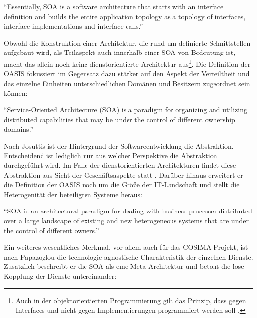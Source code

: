 \begin{definition}\label{def:soa_natis_2003_}
  "`Essentially, SOA is a software architecture that starts with an interface definition and builds the entire application topology as a topology of interfaces, interface implementations and interface calls."' \emph{\citep[S. 2]{natis2003soa}}
\end{definition}

  Obwohl die Konstruktion einer Architektur, die rund um definierte Schnittstellen aufgebaut wird, als Teilaspekt auch innerhalb einer SOA von Bedeutung ist, macht das allein noch keine dienstorientierte Architektur aus\footnote{Auch in der objektorientierten Programmierung gilt das Prinzip, dass gegen Interfaces und nicht gegen Implementierungen programmiert werden soll \citep[S. 18]{design_patterns}.}. Die Definition der OASIS fokussiert im Gegensatz dazu stärker auf den Aspekt der Verteiltheit und das einzelne Einheiten unterschiedlichen Domänen und Besitzern zugeordnet sein können:

\begin{definition}\label{def:soa_oasis_reference_model_}
  "`Service-Oriented Architecture (SOA) is a paradigm for organizing and utilizing distributed capabilities that may be under the control of different ownership domains."' \emph{\citep[S. 8]{mackenzie2006rms}}
\end{definition}

  Nach Josuttis ist der Hintergrund der Softwareentwicklung die Abstraktion. Entscheidend ist lediglich nur aus welcher Perspektive die Abstraktion durchgeführt wird. Im Falle der dienstorientierten Architekturen findet diese Abstraktion aus Sicht der Geschäftsaspekte statt \citep[S. 16]{soa_in_practice}. Darüber hinaus erweitert er die Definition der OASIS noch um die Größe der IT-Landschaft und stellt die Heterogenität der beteiligten Systeme heraus:

\begin{definition}\label{def:soa_josuttis_}
  "`SOA is an architectural paradigm for dealing with business processes distributed over a large landscape of existing and new heterogeneous systems that are under the control of different owners."' \emph{\citep[S. 24]{soa_in_practice}}
\end{definition}

  Ein weiteres wesentliches Merkmal, vor allem auch für das COSIMA-Projekt, ist nach Papazoglou die technologie-agnostische Charakteristik der einzelnen Dienste. Zusätzlich beschreibt er die SOA als eine Meta-Architektur und betont die lose Kopplung der Dienste untereinander:

